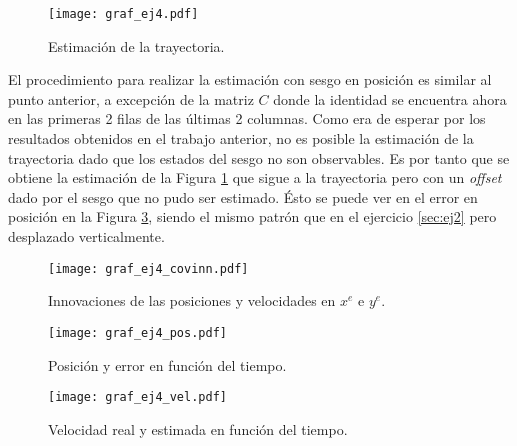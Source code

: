 

\begin{figure}[H]
\centering
\texttt{[image: graf\_ej4.pdf]}
\caption{Estimación de la trayectoria.}
\label{fig:ej4} 
\end{figure}


	El procedimiento para realizar la estimación con sesgo en posición es similar al punto anterior, a excepción de la matriz $C$ donde la identidad se encuentra ahora en las primeras 2 filas de las últimas 2 columnas. Como era de esperar por los resultados obtenidos en el trabajo anterior, no es posible la estimación de la trayectoria dado que los estados del sesgo no son observables. Es por tanto que se obtiene la estimación de la Figura \ref{fig:ej4} que sigue a la trayectoria pero con un \emph{offset} dado por el sesgo que no pudo ser estimado. Ésto se puede ver en el error en posición en la Figura \ref{fig:4pos}, siendo el mismo patrón que en el ejercicio \ref{sec:ej2} pero desplazado verticalmente.


\begin{figure}[H]
\centering
\texttt{[image: graf\_ej4\_covinn.pdf]}
\caption{Innovaciones de las posiciones y velocidades en $x^e$ e $y^e$.}
\label{fig:4covinn} 
\end{figure}


\pagebreak


\vspace*{\fill}
\begin{figure}[H]
\centering
\texttt{[image: graf\_ej4\_pos.pdf]}
\caption{Posición y error en función del tiempo.}
\label{fig:4pos} 
\end{figure}
\vspace*{\fill}

\pagebreak


\vspace*{\fill}
\begin{figure}[H]
\centering
\texttt{[image: graf\_ej4\_vel.pdf]}
\caption{Velocidad real y estimada en función del tiempo.}
\label{fig:4vel} 
\end{figure}
\vspace*{\fill}


\pagebreak
{}

